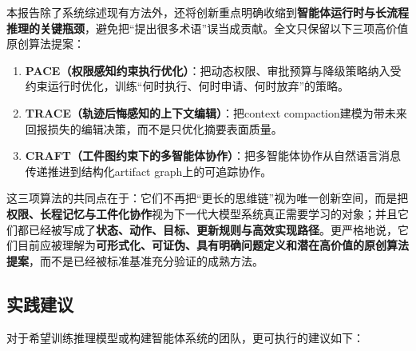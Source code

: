 \documentclass[12pt,a4paper]{article}
\begin{document}
本报告除了系统综述现有方法外，还将创新重点明确收缩到\textbf{智能体运行时与长流程推理的关键瓶颈}，避免把“提出很多术语”误当成贡献。全文只保留以下三项高价值原创算法提案：

\begin{enumerate}
    \item \textbf{PACE（权限感知约束执行优化）}：把动态权限、审批预算与降级策略纳入受约束运行时优化，训练“何时执行、何时申请、何时放弃”的策略。
    
    \item \textbf{TRACE（轨迹后悔感知的上下文编辑）}：把context compaction建模为带未来回报损失的编辑决策，而不是只优化摘要表面质量。
    
    \item \textbf{CRAFT（工件图约束下的多智能体协作）}：把多智能体协作从自然语言消息传递推进到结构化artifact graph上的可追踪协作。
\end{enumerate}

这三项算法的共同点在于：它们不再把“更长的思维链”视为唯一创新空间，而是把\textbf{权限、长程记忆与工件化协作}视为下一代大模型系统真正需要学习的对象；并且它们都已经被写成了\textbf{状态、动作、目标、更新规则与高效实现路径}。更严格地说，它们目前应被理解为\textbf{可形式化、可证伪、具有明确问题定义和潜在高价值的原创算法提案}，而不是已经被标准基准充分验证的成熟方法。

\subsection{实践建议}

对于希望训练推理模型或构建智能体系统的团队，更可执行的建议如下：
\end{document}
